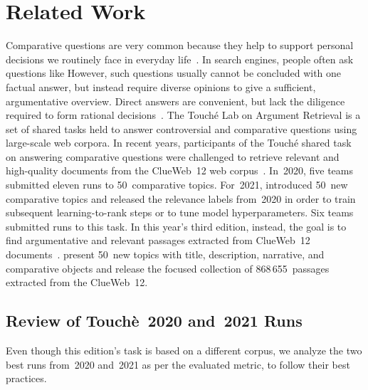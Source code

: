 \section{Related Work}

Comparative questions are very common because they help to support personal decisions we routinely face in everyday life~\cite{BondarenkoFBGAPBSWPH2020,BondarenkoGFBAPBSWPH2021,BondarenkoFKSGBPBSWPH2022}.
In search engines, people often ask questions like 
However, such questions usually cannot be concluded with one factual answer, but instead require diverse opinions to give a sufficient, argumentative overview.
Direct answers are convenient, but lack the diligence required to form rational decisions~\cite{BondarenkoFBGAPBSWPH2020,PotthastHS2020}.
The Touché Lab on Argument Retrieval is a set of shared tasks held to answer controversial and comparative questions using large-scale web corpora.
In recent years, participants of the Touché shared task on answering comparative questions were challenged to retrieve relevant and high-quality documents from the ClueWeb~12 web corpus~\cite{BondarenkoFBGAPBSWPH2020,BondarenkoGFBAPBSWPH2021,BondarenkoFKSGBPBSWPH2022}.
In~2020, five teams submitted eleven runs to 50~comparative topics.
For~2021, \citeauthor{BondarenkoGFBAPBSWPH2021} introduced 50~new comparative topics and released the relevance labels from~2020 in order to train subsequent learning-to-rank steps or to tune model hyperparameters.
Six teams submitted runs to this task.
In this year's third edition, instead, the goal is to find argumentative and relevant passages extracted from ClueWeb~12 documents~\cite{BondarenkoFKSGBPBSWPH2022}.
\citeauthor{BondarenkoFKSGBPBSWPH2022} present 50~new topics with title, description, narrative, and comparative objects and release the focused collection of 868\,655~passages extracted from the ClueWeb~12.

\subsection{Review of Touchè~2020 and~2021 Runs}

Even though this edition's task is based on a different corpus, we analyze the two best runs from~2020 and~2021 as per the evaluated  metric, to follow their best practices.

